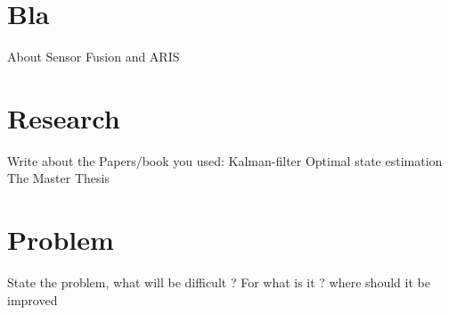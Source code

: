 
 \cite{SimonDan2006Ose:}

 
 \section{Bla}
 About Sensor Fusion and ARIS
 
 
 \section{Research}
 Write about the Papers/book you used:
 Kalman-filter
 Optimal state estimation
 The Master Thesis
 
 \section{Problem}
 State the problem, what will be difficult ? For what is it ? where should it be improved
 
